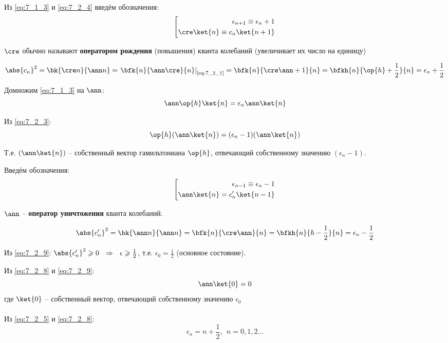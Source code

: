 Из \eqref{eq:7_1_3} и \eqref{eq:7_2_4} введём обозначения:
\begin{equation}
\label{eq:7_2_5}
\left[
\begin{aligned}
\epsilon_{n+1} \equiv \epsilon_n + 1 \\
\cre \ket{n} \equiv c_n \ket{n+1}
\end{aligned}
\right.
\end{equation}

$\cre$ обычно называют \textbf{оператором рождения} (повышения) кванта колебаний (увеличивает их число на единицу)

\begin{equation}
\label{eq:7_2_6}
\abs{c_n}^2 = \bk{\cre n}{\ann n} = \left. \bfk{n}{\ann\cre}{n} \right|_{\text{\eqref{eq:7_2_1}}} = \bfk{n}{\cre\ann + 1}{n} = \bfkh{n}{\op{h} + \frac{1}{2}}{n} = \epsilon_n + \frac{1}{2}
\end{equation}

Домножим \eqref{eq:7_1_3} на $\ann$:
$$
\ann\op{h} \ket{n} = \epsilon_n \ann \ket{n}
$$

Из \eqref{eq:7_2_3}:
\begin{equation}
\label{eq:7_2_7}
\op{h}(\ann\ket{n}) = (\epsilon_n - 1)(\ann \ket{n})
\end{equation}

Т.е. $(\ann\ket{n})$ -- собственный вектор гамильтониана $\op{h}$, отвечающий собственному значению $(\epsilon_n - 1)$.

Введём обозначения:
\begin{equation}
\label{eq:7_2_8}
\left[
\begin{aligned}
\epsilon_{n-1} \equiv \epsilon_n - 1 \\
\ann \ket{n} = c_{n}' \ket{n-1}
\end{aligned}
\right.
\end{equation}

$\ann$ -- \textbf{оператор уничтожения} кванта колебаний.

\begin{equation}
\label{eq:7_2_9}
\abs{c_n'}^2 = \bk{\ann n}{\ann n} = \bfk{n}{\cre\ann}{n} = \bfkh{n}{\hbar - \frac{1}{2}}{n} = \epsilon_n - \frac{1}{2}
\end{equation}

Из \eqref{eq:7_2_9}: $\abs{c_n'}^2 \geqslant 0 ~~\Rightarrow~~ \epsilon \geqslant \frac{1}{2}$, т.е. $\epsilon_0 = \frac{1}{2}$ (основное состояние).

Из \eqref{eq:7_2_8} и \eqref{eq:7_2_9}:
$$
	\ann \ket{0} = 0
$$
где $\ket{0}$ -- собственный вектор, отвечающий собственному значению $\epsilon_0$\\
\\
Из \eqref{eq:7_2_5} и \eqref{eq:7_2_8}: 
\begin{equation}
\label{eq:7_2_10}
\epsilon_n = n + \frac{1}{2},~~ n = 0,1,2...
\end{equation}

